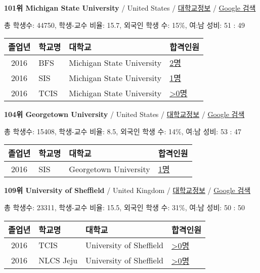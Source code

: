 \documentclass[13pt,]{article}
\begin{document}
\textbf{101위 Michigan State University} / United States /
\href{https://www.timeshighereducation.com/world-university-rankings/michigan-state-university?ranking-dataset=589595}{대학교정보}
/ \href{http://www.google.com/search?q=Michigan+State+University}{Google
검색}

총 학생수: 44750, 학생-교수 비율: 15.7, 외국인 학생 수: 15\%, 여:남
성비: 51 : 49

\begin{longtable}[]{@{}clll@{}}
\toprule
졸업년 & 학교명 & 대학교 & 합격인원\tabularnewline
\midrule
\endhead
2016 & BFS & Michigan State University &
\href{http://cafe.naver.com/assarabia/11597}{2명}\tabularnewline
2016 & SIS & Michigan State University &
\href{http://cafe.naver.com/assarabia/11589}{1명}\tabularnewline
2016 & TCIS & Michigan State University &
\href{http://cafe.naver.com/assarabia/11598}{\textgreater{}0명}\tabularnewline
\bottomrule
\end{longtable}

\textbf{104위 Georgetown University} / United States /
\href{https://www.timeshighereducation.com/world-university-rankings/georgetown-university?ranking-dataset=589595}{대학교정보}
/ \href{http://www.google.com/search?q=Georgetown+University}{Google
검색}

총 학생수: 15408, 학생-교수 비율: 8.5, 외국인 학생 수: 14\%, 여:남 성비:
53 : 47

\begin{longtable}[]{@{}clll@{}}
\toprule
졸업년 & 학교명 & 대학교 & 합격인원\tabularnewline
\midrule
\endhead
2016 & SIS & Georgetown University &
\href{http://cafe.naver.com/assarabia/11589}{1명}\tabularnewline
\bottomrule
\end{longtable}

\textbf{109위 University of Sheffield} / United Kingdom /
\href{https://www.timeshighereducation.com/world-university-rankings/university-of-sheffield?ranking-dataset=589595}{대학교정보}
/ \href{http://www.google.com/search?q=University+of+Sheffield}{Google
검색}

총 학생수: 23311, 학생-교수 비율: 15.5, 외국인 학생 수: 31\%, 여:남
성비: 50 : 50

\begin{longtable}[]{@{}clll@{}}
\toprule
졸업년 & 학교명 & 대학교 & 합격인원\tabularnewline
\midrule
\endhead
2016 & TCIS & University of Sheffield &
\href{http://cafe.naver.com/assarabia/11598}{\textgreater{}0명}\tabularnewline
2016 & NLCS Jeju & University of Sheffield &
\href{http://cafe.naver.com/assarabia/11592}{\textgreater{}0명}\tabularnewline
\bottomrule
\end{longtable}
\end{document}
